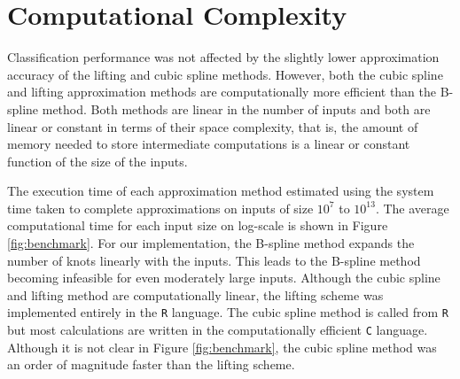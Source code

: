 
\section{Computational Complexity}

 Classification performance was not affected by the slightly lower approximation accuracy of the lifting and cubic spline methods. However, both the cubic spline and lifting approximation methods are computationally more efficient than the B-spline method. Both methods are linear in the number of inputs and both are linear or constant in terms of their space complexity, that is, 
the amount of memory needed to store intermediate computations is a linear or constant function of the size of the inputs. 

The execution time of each approximation method estimated
using the system time taken to complete approximations on 
inputs of size $10^7$ to $10^{13}$. 
The average computational time for
each input size on log-scale is shown in Figure \ref{fig:benchmark}.
For our implementation, 
the B-spline method expands the number of knots linearly with 
the inputs. This leads to the B-spline method becoming 
infeasible for even moderately large inputs. 
Although the cubic spline and lifting method are computationally 
linear, the lifting scheme was implemented entirely in the \texttt{R}
language. The cubic spline method is called from \texttt{R} but 
most calculations are written in the computationally efficient \texttt{C} language. Although it is not clear in Figure 
\ref{fig:benchmark}, the cubic spline method was an order of magnitude faster than the lifting scheme. 


